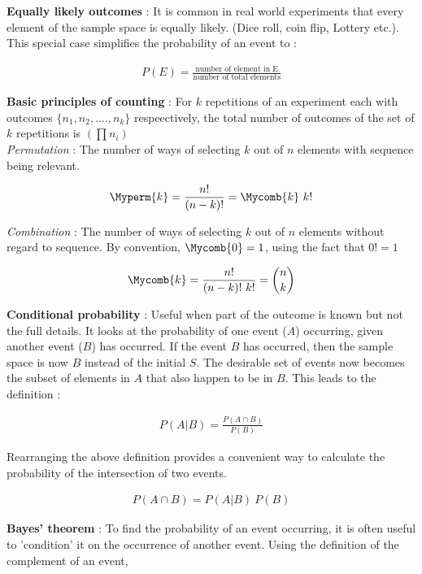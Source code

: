 \textbf{Equally likely outcomes} : It is common in real world experiments that every element of the sample space is equally likely. (Dice roll, coin flip, Lottery etc.). This special case simplifies the probability of an event to : 

\begin{align}
	P(E) = \frac{\text{number of element in E}}{\text{number of total elements}}
\end{align}

\textbf{Basic principles of counting} : For $ k $ repetitions of an experiment each with outcomes $ \{ n_1, n_2, ...., n_k \} $ respeectively, the total number of outcomes of the set of $ k $ repetitions is $ \left( \prod n_i  \right)$ \\

\textit{Permutation} : The number of ways of selecting $ k $ out of $ n $ elements with sequence being relevant.

\begin{align}
	\Myperm{k} = \frac{n!}{(n-k)!} = \Mycomb{k} \ k! 
\end{align}

\textit{Combination} : The number of ways of selecting $ k $ out of $ n $ elements without regard to sequence. By convention, $ \Mycomb{0} = 1 $, using the fact that $ 0! = 1 $

\begin{align}
	\Mycomb{k} = \frac{n!}{(n-k)! \ k!} = \binom{n}{k}
\end{align}

\textbf{Conditional probability} : Useful when part of the outcome is known but not the full details. It looks at the probability of one event ($ A $) occurring, given another event ($ B $) has occurred. If the event $ B $ has occurred, then the sample space is now $ B $ instead of the initial $ S $. The desirable set of events now becomes the subset of elements in $ A $ that also happen to be in $ B $. This leads to the definition :

\begin{align}
	P(A|B) = \frac{P(A \cap B)}{P(B)}
\end{align}

Rearranging the above definition provides a convenient way to calculate the probability of the intersection of two events. 

\begin{align}
	P(A \cap B) = P(A|B)\ P(B)
\end{align}

\textbf{Bayes' theorem} : To find the probability of an event occurring, it is often useful to 'condition' it on the occurrence of another event. Using the definition of the complement of an event, 

